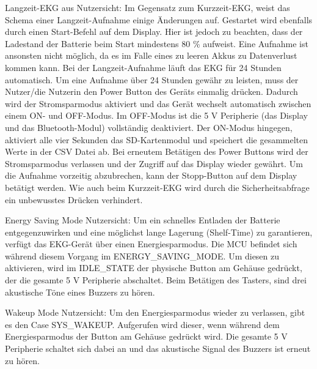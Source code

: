 Langzeit-EKG aus Nutzersicht: Im Gegensatz zum Kurzzeit-EKG, weist das Schema einer Langzeit-Aufnahme einige Änderungen auf. Gestartet wird ebenfalls durch einen Start-Befehl auf dem Display. Hier ist jedoch zu beachten, dass der Ladestand der Batterie beim Start mindestens 80 \% aufweist. Eine Aufnahme ist ansonsten nicht möglich, da es im Falle eines zu leeren Akkus zu Datenverlust kommen kann. Bei der Langzeit-Aufnahme läuft das EKG für 24 Stunden automatisch. Um eine Aufnahme über 24 Stunden gewähr zu leisten, muss der Nutzer/die Nutzerin den Power Button des Geräts einmalig drücken. Dadurch wird der Stromsparmodus aktiviert und das Gerät wechselt automatisch zwischen einem ON- und OFF-Modus. Im OFF-Modus ist die 5 V Peripherie (das Display und das Bluetooth-Modul) vollständig deaktiviert. Der ON-Modus hingegen, aktiviert alle vier Sekunden das SD-Kartenmodul und speichert die gesammelten Werte in der CSV Datei ab. Bei erneutem Betätigen des Power Buttons wird der Stromsparmodus verlassen und der Zugriff auf das Display wieder gewährt. Um die Aufnahme vorzeitig abzubrechen, kann der Stopp-Button auf dem Display betätigt werden. Wie auch beim Kurzzeit-EKG wird durch die Sicherheitsabfrage ein unbewusstes Drücken verhindert.

Energy Saving Mode Nutzersicht: Um ein schnelles Entladen der Batterie entgegenzuwirken und eine möglichst lange Lagerung (Shelf-Time) zu garantieren, verfügt das EKG-Gerät über einen Energiesparmodus. Die MCU befindet sich während diesem Vorgang im ENERGY\_SAVING\_MODE. Um diesen zu aktivieren, wird im IDLE\_STATE der physische Button am Gehäuse gedrückt, der die gesamte 5 V Peripherie abschaltet. Beim Betätigen des Tasters, sind drei akustische Töne eines Buzzers zu hören.

Wakeup Mode Nutzersicht: Um den Energiesparmodus wieder zu verlassen, gibt es den Case SYS\_WAKEUP. Aufgerufen wird dieser, wenn während dem Energiesparmodus der Button am Gehäuse gedrückt wird. Die gesamte 5 V Peripherie schaltet sich dabei an und das akustische Signal des Buzzers ist erneut zu hören.

